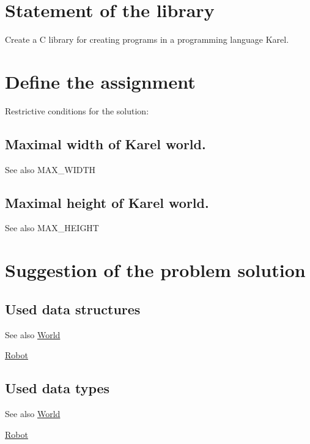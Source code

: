 \hypertarget{index_s_statement}{}\section{Statement of the library}\label{index_s_statement}
Create a C library for creating programs in a programming language Karel.\hypertarget{index_s_define}{}\section{Define the assignment}\label{index_s_define}
Restrictive conditions for the solution:\hypertarget{index_ss_ww}{}\subsection{Maximal width of Karel world.}\label{index_ss_ww}
\begin{DoxySeeAlso}{See also}
MAX\_\-WIDTH
\end{DoxySeeAlso}
\hypertarget{index_ss_wh}{}\subsection{Maximal height of Karel world.}\label{index_ss_wh}
\begin{DoxySeeAlso}{See also}
MAX\_\-HEIGHT
\end{DoxySeeAlso}
\hypertarget{index_s_suggestion}{}\section{Suggestion of the problem solution}\label{index_s_suggestion}
\hypertarget{index_ss_structure}{}\subsection{Used data structures}\label{index_ss_structure}
\begin{DoxySeeAlso}{See also}
\hyperlink{structWorld}{World} 

\hyperlink{structRobot}{Robot}
\end{DoxySeeAlso}
\hypertarget{index_ss_type}{}\subsection{Used data types}\label{index_ss_type}
\begin{DoxySeeAlso}{See also}
\hyperlink{structWorld}{World} 

\hyperlink{structRobot}{Robot}
\end{DoxySeeAlso}
